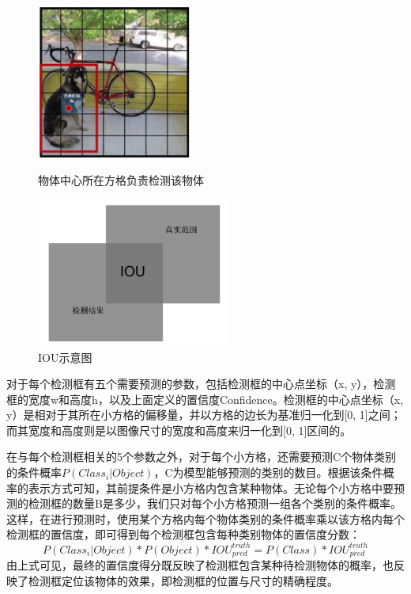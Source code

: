 \begin{figure}[htb] %
	\centering
	\begin{minipage}[c]{0.48\textwidth}
		\centering
		\includegraphics[width=2in]{figures/3_2_物体中心所在方格负责检测该物体}
		\caption{物体中心所在方格负责检测该物体} \label{fig:3_2_物体中心所在方格负责检测该物体}
	\end{minipage}
	\hfill
	\begin{minipage}[c]{0.48\textwidth}
		\centering
		\includegraphics[width=2.5in]{figures/3_2_IOU}
		\caption{IOU示意图} \label{fig:3_2_IOU}
	\end{minipage}
\end{figure}

对于每个检测框有五个需要预测的参数，包括检测框的中心点坐标（x, y），检测框的宽度w和高度h，以及上面定义的置信度Confidence。检测框的中心点坐标（x, y）是相对于其所在小方格的偏移量，并以方格的边长为基准归一化到[0, 1]之间；而其宽度和高度则是以图像尺寸的宽度和高度来归一化到[0, 1]区间的。

在与每个检测框相关的5个参数之外，对于每个小方格，还需要预测C个物体类别的条件概率$P(Class_i|Object)$，C为模型能够预测的类别的数目。根据该条件概率的表示方式可知，其前提条件是小方格内包含某种物体。无论每个小方格中要预测的检测框的数量B是多少，我们只对每个小方格预测一组各个类别的条件概率。这样，在进行预测时，使用某个方格内每个物体类别的条件概率乘以该方格内每个检测框的置信度，即可得到每个检测框包含每种类别物体的置信度分数：
\begin{equation}
P(Class_i | Object) * P(Object) * IOU_{pred}^{truth} = P(Class) * IOU_{pred}^{truth}
\end{equation}
由上式可见，最终的置信度得分既反映了检测框包含某种待检测物体的概率，也反映了检测框定位该物体的效果，即检测框的位置与尺寸的精确程度。

